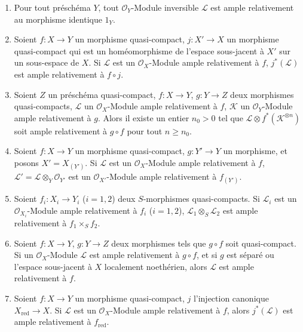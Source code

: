 \begin{proposition}[4.6.13]
\label{II.4.6.13-fr}
\begin{enumerate}
  \item[\rm{(i)}] Pour tout préschéma $Y$, tout
  $\mathcal{O}_Y$-Module inversible $\mathcal{L}$ est ample relativement
  au morphisme identique $1_Y$.
  \item[\rm{(i \textit{bis})}] Soient $f:X\to Y$ un morphisme quasi-compact,
  $j:X'\to X$ un morphisme quasi-compact qui est un homéomorphisme de
  l'espace sous-jacent à $X'$ sur un sous-espace de $X$. Si $\mathcal{L}$
  est un $\mathcal{O}_X$-Module ample relativement à $f$,
  $j^*(\mathcal{L})$ est ample relativement à $f\circ j$.
  \item[\rm{(ii)}] Soient $Z$ un préschéma quasi-compact, $f:X\to Y$,
  $g:Y\to Z$ deux morphismes quasi-compacts, $\mathcal{L}$ un
  $\mathcal{O}_X$-Module ample relativement à $f$, $\mathcal{K}$ un
  $\mathcal{O}_Y$-Module ample relativement à $g$. Alors il existe un
  entier $n_0>0$ tel que
  $\mathcal{L}\otimes f^*(\mathcal{K}^{\otimes n})$ soit ample relativement
  à $g\circ f$ pour tout $n\geq n_0$.
  \item[\rm{(iii)}] Soient $f:X\to Y$ un morphisme quasi-compact,
  $g:Y'\to Y$ un morphisme, et posons $X'=X_{(Y')}$. Si $\mathcal{L}$ est
  un $\mathcal{O}_X$-Module ample relativement à $f$,
  $\mathcal{L}'=\mathcal{L}\otimes_Y\mathcal{O}_{Y'}$ est un
  $\mathcal{O}_{X'}$-Module ample relativement à $f_{(Y')}$.
  \item[\rm{(iv)}] Soient $f_i:X_i\to Y_i$ ($i=1,2$) deux
  $S$-morphismes quasi-compacts. Si $\mathcal{L}_i$ est un
  $\mathcal{O}_{X_i}$-Module ample relativement à $f_i$ ($i=1,2$),
  $\mathcal{L}_1\otimes_S\mathcal{L}_2$ est ample relativement à
  $f_1\times_S f_2$.
  \item[\rm{(v)}] Soient $f:X\to Y$, $g:Y\to Z$ deux morphismes tels que
  $g\circ f$ soit quasi-compact. Si un
  $\mathcal{O}_X$-Module
  $\mathcal{L}$ est ample relativement à $g\circ f$, et si $g$ est séparé
  ou l'espace sous-jacent à $X$ localement noethérien, alors $\mathcal{L}$
  est ample relativement à $f$.

  \item[\rm{(vi)}] Soient $f:X\to Y$ un morphisme quasi-compact, $j$
  l'injection canonique $X_{\mathrm{red}}\to X$. Si $\mathcal{L}$ est un
  $\mathcal{O}_X$-Module ample relativement à $f$, alors
  $j^*(\mathcal{L})$ est ample relativement à $f_{\mathrm{red}}$.
\end{enumerate}
\end{proposition}

